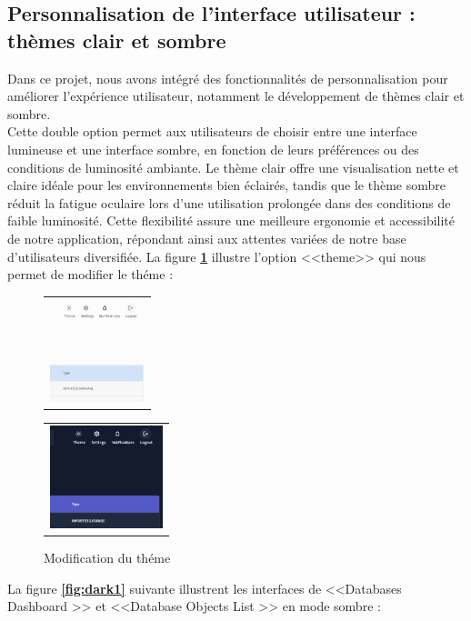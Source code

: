 \subsection{Personnalisation de l'interface utilisateur : thèmes clair et sombre}
\par Dans ce projet, nous avons intégré des fonctionnalités de personnalisation pour améliorer l'expérience utilisateur, notamment le développement de thèmes clair et sombre. \\ Cette double option permet aux 
utilisateurs de choisir entre une interface lumineuse et une interface sombre, en fonction de leurs préférences ou des conditions de luminosité ambiante. Le thème clair offre une visualisation nette et claire idéale
 pour les environnements bien éclairés, tandis que le thème sombre réduit la fatigue oculaire lors d'une utilisation prolongée dans des conditions de faible luminosité. Cette flexibilité assure une meilleure ergonomie 
 et accessibilité de notre application, répondant ainsi aux attentes variées de notre base d'utilisateurs diversifiée.
 La figure \textbf{\ref{fig:theme}} illustre l'option <<theme>> qui nous permet de modifier le théme :
 \begin{figure}[H]
    \centering
    \begin{tabular}[b]{c}
        \includegraphics[width=0.3\linewidth,height=3cm ]{img/captures/dark/5.jpg}
        \end{tabular}
        \begin{tabular}[b]{c}
            \includegraphics[width=0.3\linewidth ,height=3cm]{img/captures/dark/7.jpg}
            \end{tabular}
            \caption{Modification du théme}
            \label{fig:theme}
\end{figure}
\newpage
\par La figure \textbf{\ref{fig:dark1}} suivante illustrent les interfaces de <<Databases Dashboard >> et <<Database Objects List >> en mode sombre :
